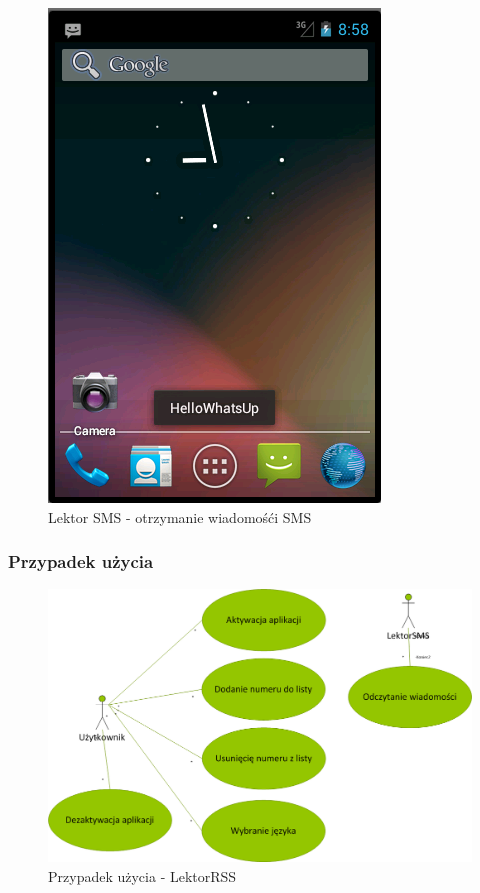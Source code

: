 \begin{figure}[!h]
	\centering
	\includegraphics[scale=0.45]{SmsReaderScreen.png} 
	\caption{Lektor SMS - otrzymanie wiadomośći SMS} \label{fig:SmsReaderScreen}
\end{figure}
\subsubsection{Przypadek użycia}
\begin{figure}[!h]
	\centering
	\includegraphics[scale=0.45]{useCaseLektorSMS.png} 
	\caption{Przypadek użycia - LektorRSS}
\end{figure}

